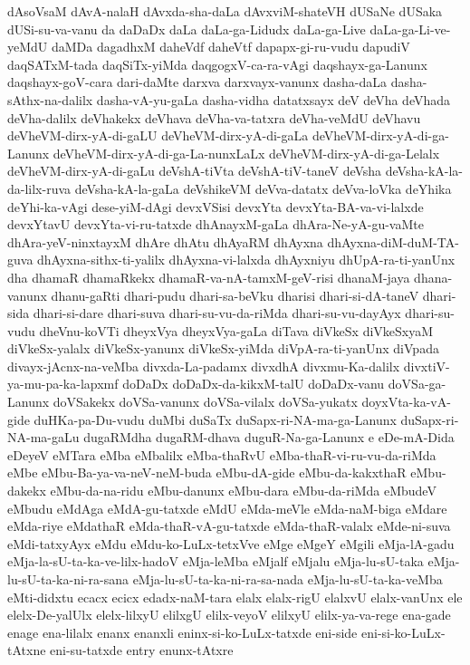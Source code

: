 {dAsoVsaM
dAvA-nalaH
dAvxda-sha-daLa
dAvxviM-shateVH
dUSaNe
dUSaka
dUSi-su-va-vanu
da
daDaDx
daLa
daLa-ga-Lidudx
daLa-ga-Live
daLa-ga-Li-ve-yeMdU
daMDa
dagadhxM
daheVdf
daheVtf
dapapx-gi-ru-vudu
dapudiV
daqSATxM-tada
daqSiTx-yiMda
daqgogxV-ca-ra-vAgi
daqshayx-ga-Lanunx
daqshayx-goV-cara
dari-daMte
darxva
darxvayx-vanunx
dasha-daLa
dasha-sAthx-na-dalilx
dasha-vA-yu-gaLa
dasha-vidha
datatxsayx
deV
deVha
deVhada
deVha-dalilx
deVhakekx
deVhava
deVha-va-tatxra
deVha-veMdU
deVhavu
deVheVM-dirx-yA-di-gaLU
deVheVM-dirx-yA-di-gaLa
deVheVM-dirx-yA-di-ga-Lanunx
deVheVM-dirx-yA-di-ga-La-nunxLaLx
deVheVM-dirx-yA-di-ga-Lelalx
deVheVM-dirx-yA-di-gaLu
deVshA-tiVta
deVshA-tiV-taneV
deVsha
deVsha-kA-la-da-lilx-ruva
deVsha-kA-la-gaLa
deVshikeVM
deVva-datatx
deVva-loVka
deYhika
deYhi-ka-vAgi
dese-yiM-dAgi
devxVSisi
devxYta
devxYta-BA-va-vi-lalxde
devxYtavU
devxYta-vi-ru-tatxde
dhAnayxM-gaLa
dhAra-Ne-yA-gu-vaMte
dhAra-yeV-ninxtayxM
dhAre
dhAtu
dhAyaRM
dhAyxna
dhAyxna-diM-duM-TA-guva
dhAyxna-sithx-ti-yalilx
dhAyxna-vi-lalxda
dhAyxniyu
dhUpA-ra-ti-yanUnx
dha
dhamaR
dhamaRkekx
dhamaR-va-nA-tamxM-geV-risi
dhanaM-jaya
dhana-vanunx
dhanu-gaRti
dhari-pudu
dhari-sa-beVku
dharisi
dhari-si-dA-taneV
dhari-sida
dhari-si-dare
dhari-suva
dhari-su-vu-da-riMda
dhari-su-vu-dayAyx
dhari-su-vudu
dheVnu-koVTi
dheyxVya
dheyxVya-gaLa
diTava
diVkeSx
diVkeSxyaM
diVkeSx-yalalx
diVkeSx-yanunx
diVkeSx-yiMda
diVpA-ra-ti-yanUnx
diVpada
divayx-jAcnx-na-veMba
divxda-La-padamx
divxdhA
divxmu-Ka-dalilx
divxtiV-ya-mu-pa-ka-lapxmf
doDaDx
doDaDx-da-kikxM-talU
doDaDx-vanu
doVSa-ga-Lanunx
doVSakekx
doVSa-vanunx
doVSa-vilalx
doVSa-yukatx
doyxVta-ka-vA-gide
duHKa-pa-Du-vudu
duMbi
duSaTx
duSapx-ri-NA-ma-ga-Lanunx
duSapx-ri-NA-ma-gaLu
dugaRMdha
dugaRM-dhava
duguR-Na-ga-Lanunx
e
eDe-mA-Dida
eDeyeV
eMTara
eMba
eMbalilx
eMba-thaRvU
eMba-thaR-vi-ru-vu-da-riMda
eMbe
eMbu-Ba-ya-va-neV-neM-buda
eMbu-dA-gide
eMbu-da-kakxthaR
eMbu-dakekx
eMbu-da-na-ridu
eMbu-danunx
eMbu-dara
eMbu-da-riMda
eMbudeV
eMbudu
eMdAga
eMdA-gu-tatxde
eMdU
eMda-meVle
eMda-naM-biga
eMdare
eMda-riye
eMdathaR
eMda-thaR-vA-gu-tatxde
eMda-thaR-valalx
eMde-ni-suva
eMdi-tatxyAyx
eMdu
eMdu-ko-LuLx-tetxVve
eMge
eMgeY
eMgili
eMja-lA-gadu
eMja-la-sU-ta-ka-ve-lilx-hadoV
eMja-leMba
eMjalf
eMjalu
eMja-lu-sU-taka
eMja-lu-sU-ta-ka-ni-ra-sana
eMja-lu-sU-ta-ka-ni-ra-sa-nada
eMja-lu-sU-ta-ka-veMba
eMti-didxtu
ecacx
ecicx
edadx-naM-tara
elalx
elalx-rigU
elalxvU
elalx-vanUnx
ele
elelx-De-yalUlx
elelx-lilxyU
elilxgU
elilx-veyoV
elilxyU
elilx-ya-va-rege
ena-gade
enage
ena-lilalx
enanx
enanxli
eninx-si-ko-LuLx-tatxde
eni-side
eni-si-ko-LuLx-tAtxne
eni-su-tatxde
entry
enunx-tAtxre
}
